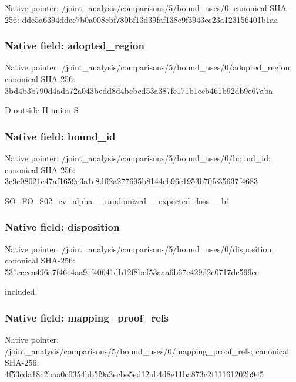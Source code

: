 \documentclass[10pt,a4paper]{article}
\begin{document}
Native pointer: /joint\_analysis/comparis\allowbreak{}ons/5/bound\_uses/0; canonical SHA-256: dde5a6394ddec7b0a008cbf7\allowbreak{}80bf13d39faf138e9f3943cc\allowbreak{}23a123156401b1aa



\subsubsection{Native field: adopted\_region}


Native pointer: /joint\_analysis/comparis\allowbreak{}ons/5/bound\_uses/0/adopt\allowbreak{}ed\_region; canonical SHA-256: 3bd4b3b790d4ada72a043bed\allowbreak{}d8d4bcbcd53a387fc171b1ec\allowbreak{}b461b92db9e67aba


D outside H union S


\subsubsection{Native field: bound\_id}


Native pointer: /joint\_analysis/comparis\allowbreak{}ons/5/bound\_uses/0/bound\allowbreak{}\_id; canonical SHA-256: 3c9c08021e47af1659e3a1e8\allowbreak{}dff2a277695b8144eb96e195\allowbreak{}3b70fc35637f4683


SO\_FO\_S02\_cv\_alpha\_\_rand\allowbreak{}omized\_\_expected\_loss\_\_b\allowbreak{}1


\subsubsection{Native field: disposition}


Native pointer: /joint\_analysis/comparis\allowbreak{}ons/5/bound\_uses/0/dispo\allowbreak{}sition; canonical SHA-256: 531cecca496a7f46e4aa9ef4\allowbreak{}0641db12f8bef53aaa6b67c4\allowbreak{}29d2c0717dc599ce


included


\subsubsection{Native field: mapping\_proof\_refs}


Native pointer: /joint\_analysis/comparis\allowbreak{}ons/5/bound\_uses/0/mappi\allowbreak{}ng\_proof\_refs; canonical SHA-256: 4f53cda18c2baa0c0354bb5f\allowbreak{}9a3ecbe5ed12ab4d8e11ba87\allowbreak{}3c2f11161202b945
\end{document}
